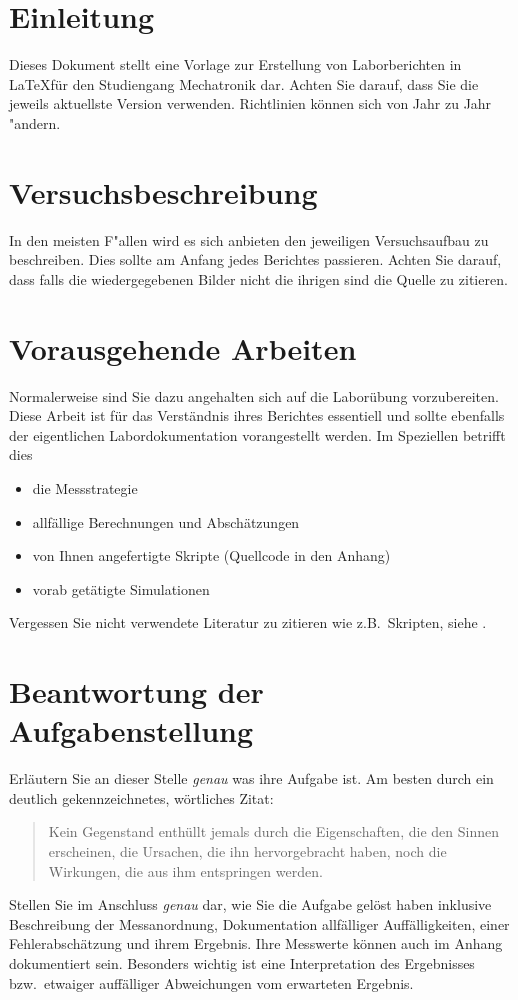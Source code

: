 \documentclass[a4paper, ngerman, oneside, 10pt]{article}
\begin{document}

\pagestyle{fancy} %
\section{Einleitung}
Dieses Dokument stellt eine Vorlage zur Erstellung von Laborberichten in \LaTeX für den Studiengang Mechatronik dar. Achten Sie darauf, dass Sie die jeweils aktuellste Version verwenden. Richtlinien können sich von Jahr zu Jahr "andern.

\section{Versuchsbeschreibung}
In den meisten F"allen wird es sich anbieten den jeweiligen Versuchsaufbau zu beschreiben. Dies sollte am Anfang jedes Berichtes passieren. Achten Sie darauf, dass falls die wiedergegebenen Bilder nicht die ihrigen sind die Quelle zu zitieren.

\section{Vorausgehende Arbeiten}
Normalerweise sind Sie dazu angehalten sich auf die Laborübung vorzubereiten. Diese Arbeit ist für das Verständnis ihres Berichtes essentiell und sollte ebenfalls der eigentlichen Labordokumentation vorangestellt werden. Im Speziellen betrifft dies
\begin{itemize}
	\item die Messstrategie
	\item allfällige Berechnungen und Abschätzungen
	\item von Ihnen angefertigte Skripte (Quellcode in den Anhang)
	\item vorab getätigte Simulationen
\end{itemize}
Vergessen Sie nicht verwendete Literatur zu zitieren wie z.B.~Skripten, siehe \cite{meh10}.

\section{Beantwortung der Aufgabenstellung}
Erläutern Sie an dieser Stelle \emph{genau} was ihre Aufgabe ist. Am besten durch ein deutlich gekennzeichnetes, wörtliches Zitat:
\begin{quote}
	Kein Gegenstand enthüllt jemals durch die Eigenschaften, die den Sinnen erscheinen, die Ursachen, die ihn hervorgebracht haben, noch die Wirkungen, die aus ihm entspringen werden.
\end{quote}
Stellen Sie im Anschluss \emph{genau} dar, wie Sie die Aufgabe gelöst haben inklusive Beschreibung der Messanordnung, Dokumentation allfälliger Auffälligkeiten, einer Fehlerabschätzung und ihrem Ergebnis. Ihre Messwerte können auch im Anhang dokumentiert sein. Besonders wichtig ist eine Interpretation des Ergebnisses bzw.~etwaiger auffälliger Abweichungen vom erwarteten Ergebnis.
\end{document}
